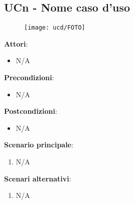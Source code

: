 \subsection{UCn - Nome caso d'uso}\label{usecase:n}
\begin{figure}[H]
    \centering
    \texttt{[image: ucd/FOTO]}
\end{figure}
\textbf{Attori}:
\begin{itemize}
    \item N/A
\end{itemize}
\textbf{Precondizioni}:
\begin{itemize}
    \item N/A
\end{itemize}
\textbf{Postcondizioni}:
\begin{itemize}
    \item N/A
\end{itemize}
\textbf{Scenario principale}:
\begin{enumerate}
    \item N/A
\end{enumerate}
\textbf{Scenari alternativi}: %
\begin{enumerate}
    \item N/A
\end{enumerate}
\newpage

